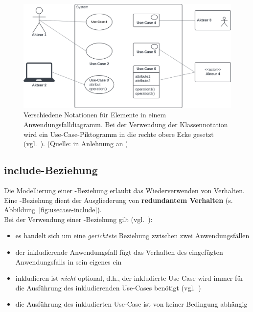 \begin{figure}
    \centering
    \includegraphics[scale=0.35]{part three/Anwendungsfalldiagramm/img/usecase-notation}
    \caption{Verschiedene Notationen für Elemente in einem Anwendungsfalldiagramm. Bei der Verwendung der Klassennotation wird ein Use-Case-Piktogramm in die rechte obere Ecke gesetzt (vgl.~\cite[63 f.]{Bal05}). (Quelle: in Anlehnung an \cite[64, Abb. 2.8-2]{Bal05})}
    \label{fig:usecase-notation}
\end{figure}


\subsection{include-Beziehung}

Die Modellierung einer -Beziehung erlaubt das Wiederverwenden von Verhalten.\\

\noindent
Eine -Beziehung dient der Ausgliederung von \textbf{redundantem Verhalten} (s. Abbildung~\ref{fig:usecase-include}).\\

\noindent
Bei der Verwendung einer -Beziehung gilt (vgl.~\cite[53]{Buh09}):


\begin{itemize}
    \item es handelt sich um eine \textit{gerichtete} Beziehung zwischen zwei Anwendungsfällen
    \item der inkludierende Anwendungsfall fügt das Verhalten des eingefügten Anwendungsfalls in sein eigenes ein
    \item inkludieren ist \textit{nicht} optional, d.h., der inkludierte Use-Case wird immer für die Ausführung des inkludierenden Use-Cases benötigt (vgl.~\cite[65 f.]{Bal05})
    \item die Ausführung des inkludierten Use-Case ist von keiner Bedingung abhängig
\end{itemize}

